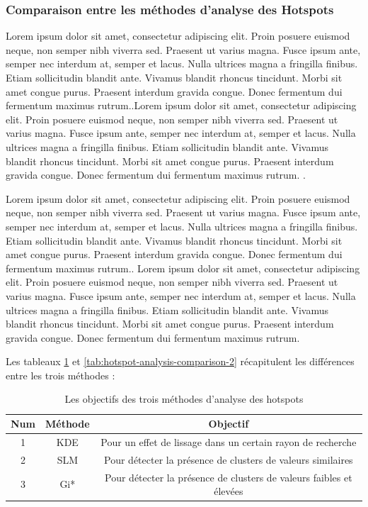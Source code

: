 \subsubsection{Comparaison entre les méthodes d'analyse des Hotspots}
Lorem ipsum dolor sit amet, consectetur adipiscing elit. Proin posuere euismod neque, non semper nibh viverra sed. Praesent ut varius magna. Fusce ipsum ante, semper nec interdum at, semper et lacus. Nulla ultrices magna a fringilla finibus. Etiam sollicitudin blandit ante. Vivamus blandit rhoncus tincidunt. Morbi sit amet congue purus. Praesent interdum gravida congue. Donec fermentum dui fermentum maximus rutrum.\parencite{kalinic_kernel_2018}.Lorem ipsum dolor sit amet, consectetur adipiscing elit. Proin posuere euismod neque, non semper nibh viverra sed. Praesent ut varius magna. Fusce ipsum ante, semper nec interdum at, semper et lacus. Nulla ultrices magna a fringilla finibus. Etiam sollicitudin blandit ante. Vivamus blandit rhoncus tincidunt. Morbi sit amet congue purus. Praesent interdum gravida congue. Donec fermentum dui fermentum maximus rutrum. \parencite{kalinic_kernel_2018}.

\medskip

Lorem ipsum dolor sit amet, consectetur adipiscing elit. Proin posuere euismod neque, non semper nibh viverra sed. Praesent ut varius magna. Fusce ipsum ante, semper nec interdum at, semper et lacus. Nulla ultrices magna a fringilla finibus. Etiam sollicitudin blandit ante. Vivamus blandit rhoncus tincidunt. Morbi sit amet congue purus. Praesent interdum gravida congue. Donec fermentum dui fermentum maximus rutrum.\parencite{chang_introduction_2019}. Lorem ipsum dolor sit amet, consectetur adipiscing elit. Proin posuere euismod neque, non semper nibh viverra sed. Praesent ut varius magna. Fusce ipsum ante, semper nec interdum at, semper et lacus. Nulla ultrices magna a fringilla finibus. Etiam sollicitudin blandit ante. Vivamus blandit rhoncus tincidunt. Morbi sit amet congue purus. Praesent interdum gravida congue. Donec fermentum dui fermentum maximus rutrum.

\medskip

Les tableaux \ref{tab:hotspot-analysis-comparison-1} et \ref{tab:hotspot-analysis-comparison-2} récapitulent les différences entre les trois méthodes :

\medskip

\begin{table}[h!]
    \centering
    \begin{tabular}{|c|c|c|}
        \hline
        Num & Méthode & Objectif \\
        \hline
         1 & KDE &  Pour un effet de lissage dans un certain rayon de recherche \\
        \hline
         2 & SLM & Pour détecter la présence de clusters de valeurs similaires \\
        \hline
        3 & Gi* &  Pour détecter la présence de clusters de valeurs faibles et élevées\\
        \hline
    \end{tabular}
    \caption{Les objectifs des trois méthodes d'analyse des hotspots}
    \label{tab:hotspot-analysis-comparison-1}
\end{table}
\FloatBarrier

